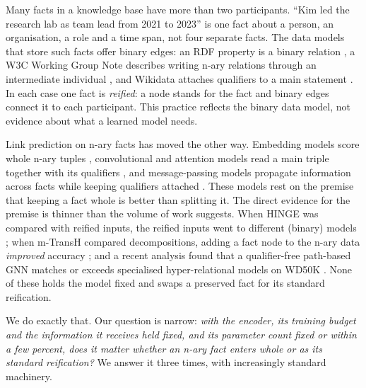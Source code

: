 \documentclass[11pt,a4paper]{article}
\begin{document}
Many facts in a knowledge base have more than two participants. ``Kim led the research lab as team lead from 2021 to 2023'' is one fact about a person, an organisation, a role and a time span, not four separate facts. The data models that store such facts offer binary edges: an RDF property is a binary relation \citep{cyganiak2014rdf}, a W3C Working Group Note describes writing n-ary relations through an intermediate individual \citep{noy2006nary}, and Wikidata attaches qualifiers to a main statement \citep{vrandecic2014wikidata}. In each case one fact is \emph{reified}: a node stands for the fact and binary edges connect it to each participant. This practice reflects the binary data model, not evidence about what a learned model needs.

Link prediction on n-ary facts has moved the other way. Embedding models score whole n-ary tuples \citep{wen2016mtransh,guan2019nalp,fatemi2020hype}, convolutional and attention models read a main triple together with its qualifiers \citep{rosso2020hinge,wang2021gran,hu2023hyperformer}, and message-passing models propagate information across facts while keeping qualifiers attached \citep{galkin2020stare,luo2023hahe,lee2025maypl,lee2026krepe,ji2026glore}. These models rest on the premise that keeping a fact whole is better than splitting it. The direct evidence for the premise is thinner than the volume of work suggests. When HINGE was compared with reified inputs, the reified inputs went to different (binary) models \citep{rosso2020hinge}; when m-TransH compared decompositions, adding a fact node to the n-ary data \emph{improved} accuracy \citep{wen2016mtransh}; and a recent analysis found that a qualifier-free path-based GNN matches or exceeds specialised hyper-relational models on WD50K \citep{wang2025understanding}. None of these holds the model fixed and swaps a preserved fact for its standard reification.

We do exactly that. Our question is narrow: \emph{with the encoder, its training budget and the information it receives held fixed, and its parameter count fixed or within a few percent, does it matter whether an n-ary fact enters whole or as its standard reification?} We answer it three times, with increasingly standard machinery.
\end{document}
